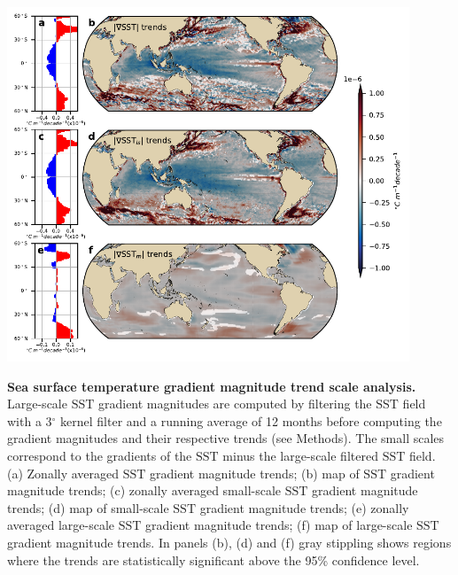 \documentclass{nature}
\newcommand{\SST}{\text{SST}}
\begin{document}
\begin{figureS}
    \centering
	\hspace{0.05\textwidth}\includegraphics[width=0.9\textwidth]{./figures/global_SST_diff_scales_trends.pdf}
	\caption{\textbf{Sea surface temperature gradient magnitude trend scale analysis.} Large-scale $\SST$ gradient magnitudes are computed by filtering the $\SST$ field with a 3$^\circ$ kernel filter and a running average of 12 months before computing the gradient magnitudes and their respective trends (see Methods). The small scales correspond to the gradients of the $\SST$ minus the large-scale filtered $\SST$ field. (a) Zonally averaged $\SST$ gradient magnitude trends; (b) map of  $\SST$ gradient magnitude trends; (c) zonally averaged small-scale $\SST$ gradient magnitude trends; (d) map of small-scale $\SST$ gradient magnitude trends; (e) zonally averaged large-scale $\SST$ gradient magnitude trends; (f) map of large-scale $\SST$ gradient magnitude trends. In panels (b), (d) and (f) gray stippling shows regions where the trends are statistically significant above the 95\% confidence level. \label{fig:global_SST_grad_scales}}
\end{figureS}
\end{document}
